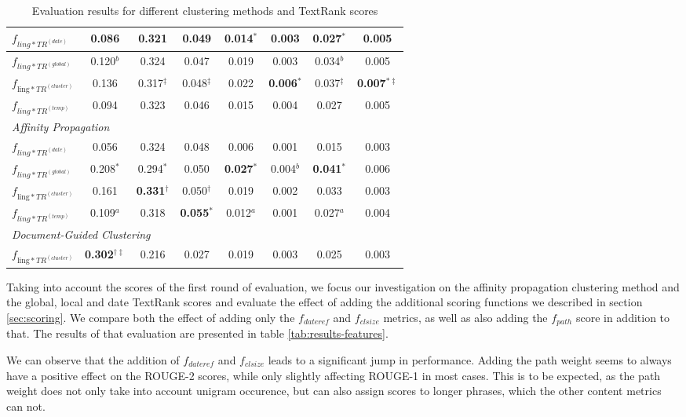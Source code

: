\documentclass[a4paper,BCOR=10mm]{report}
\numberwithin{lemma}{chapter}
\numberwithin{definition}{chapter}
\begin{document}
\begin{table}
\begin{centering}
{\begin{tabular}{|l|c|cc|cc|cc|}
$f_{ling*TR^{(date)}}$   & 0.086    & 0.321 & 0.049 & 0.014$^{*}$   & 0.003 & 0.027$^{*}$   & 0.005 \\\hline
$f_{ling*TR^{(global)}}$     & 0.120$^{b}$  & 0.324 & 0.047 & 0.019 & 0.003 & 0.034$^{b}$   & 0.005 \\\hline
$f_{\text{ling}*TR^{(cluster)}}$     & 0.136    & 0.317$^{\ddagger}$    & 0.048$^{\ddagger}$    & 0.022 & \textbf{0.006}$^{*}$  & 0.037$^{\ddagger}$    & \textbf{0.007}$^{*\ddagger}$ \\\hline
$f_{ling*TR^{(temp)}}$   & 0.094    & 0.323 & 0.046 & 0.015 & 0.004 & 0.027 & 0.005 \\\hline
\multicolumn{8}{|l|}{ \textit{Affinity Propagation} }\\\hline
$f_{ling*TR^{(date)}}$   & 0.056    & 0.324 & 0.048 & 0.006 & 0.001 & 0.015 & 0.003 \\\hline
$f_{ling*TR^{(global)}}$     & 0.208$^{*}$  & 0.294$^{*}$   & 0.050 & \textbf{0.027}$^{*}$  & 0.004$^{b}$   & \textbf{0.041}$^{*}$  & 0.006 \\\hline
$f_{\text{ling}*TR^{(cluster)}}$     & 0.161    & \textbf{0.331}$^{\dagger}$    & 0.050$^{\dagger}$ & 0.019 & 0.002 & 0.033 & 0.003 \\\hline
$f_{ling*TR^{(temp)}}$   & 0.109$^{a}$  & 0.318 & \textbf{0.055}$^{*}$  & 0.012$^{a}$   & 0.001 & 0.027$^{a}$   & 0.004 \\\hline
\multicolumn{8}{|l|}{ \textit{Document-Guided Clustering} }\\\hline
$f_{\text{ling}*TR^{(cluster)}}$     & \textbf{0.302}$^{\dagger\ddagger}$   & 0.216 & 0.027 & 0.019 & 0.003 & 0.025 & 0.003 \\\hline
\end{tabular}
}
\end{centering}
\caption{Evaluation results for different clustering methods and TextRank scores}
\label{tab:eval-cl-tr}
\end{table}


Taking into account the scores of the first round of evaluation, we focus our investigation on the affinity propagation clustering method and the global, local and date TextRank scores and evaluate the effect of adding the additional scoring functions we described in section \ref{sec:scoring}.
We compare both the effect of adding only the $f_{dateref}$ and $f_{clsize}$ metrics, as well as also adding the $f_{path}$ score in addition to that.
The results of that evaluation are presented in table \ref{tab:results-features}.

We can observe that the addition of $f_{dateref}$ and $f_{clsize}$ leads to a significant jump in performance.
Adding the path weight seems to always have a positive effect on the ROUGE-2 scores, while only slightly affecting ROUGE-1 in most cases.
This is to be expected, as the path weight does not only take into account unigram occurence, but can also assign scores to longer phrases, which the other content metrics can not.
\end{document}
